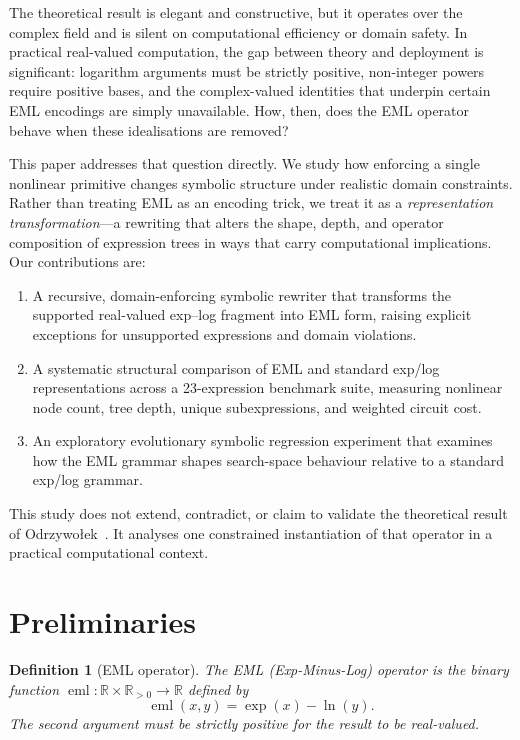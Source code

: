 \documentclass[11pt,a4paper]{article}
\newcommand{\eml}{\operatorname{eml}}
\newcommand{\expf}{\operatorname{exp}}
\newcommand{\lnf}{\operatorname{ln}}
\newtheorem{definition}{Definition}
\begin{document}
The theoretical result is elegant and constructive, but it operates over the
complex field and is silent on computational efficiency or domain safety.
In practical real-valued computation, the gap between theory and deployment is
significant: logarithm arguments must be strictly positive, non-integer
powers require positive bases, and the complex-valued identities that underpin
certain EML encodings are simply unavailable. How, then, does the EML operator
behave when these idealisations are removed?

This paper addresses that question directly. We study how enforcing a
single nonlinear primitive changes symbolic structure under realistic
domain constraints. Rather than treating EML as an encoding trick, we treat
it as a \emph{representation transformation}---a rewriting that alters the
shape, depth, and operator composition of expression trees in ways that carry
computational implications. Our contributions are:

\begin{enumerate}
  \item A recursive, domain-enforcing symbolic rewriter that transforms the
        supported real-valued exp--log fragment into EML form, raising
        explicit exceptions for unsupported expressions and domain violations.
  \item A systematic structural comparison of EML and standard exp/log
        representations across a 23-expression benchmark suite, measuring
        nonlinear node count, tree depth, unique subexpressions, and
        weighted circuit cost.
  \item An exploratory evolutionary symbolic regression experiment that
        examines how the EML grammar shapes search-space behaviour relative
        to a standard exp/log grammar.
\end{enumerate}

This study does not extend, contradict, or claim to validate the theoretical
result of Odrzywołek~\cite{odrzywolek2026eml}. It analyses one constrained
instantiation of that operator in a practical computational context.

\section{Preliminaries}
\label{sec:prelim}

\begin{definition}[EML operator]
  The EML (Exp-Minus-Log) operator is the binary function
  $\eml : \mathbb{R} \times \mathbb{R}_{>0} \to \mathbb{R}$ defined by
  \begin{equation}
    \eml(x, y) = \expf(x) - \lnf(y).
    \label{eq:eml_defn}
  \end{equation}
  The second argument must be strictly positive for the result to be real-valued.
\end{definition}
\end{document}
